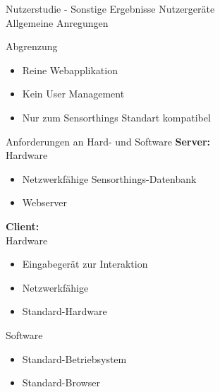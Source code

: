 \begin{frame}{Nutzerstudie - Sonstige Ergebnisse}
    \centering
    Nutzergeräte
    \\
    \vspace{1cm}
    Allgemeine Anregungen
\end{frame}
\begin{frame}{Abgrenzung}
    \begin{itemize}
        \item Reine Webapplikation
        \item Kein User Management
        \item Nur zum Sensorthings Standart kompatibel
    \end{itemize}
\end{frame}
\begin{frame}{Anforderungen an Hard- und Software}
    \textbf{Server:}\\
    Hardware
    \begin{itemize}
        \item Netzwerkfähige Sensorthings-Datenbank
        \item Webserver
    \end{itemize}
    \pause
    \textbf{Client:}\\
    Hardware
    \begin{itemize}
        \item Eingabegerät zur Interaktion
        \item Netzwerkfähige
        \item Standard-Hardware
    \end{itemize}
    \pause
    Software
    \begin{itemize}
        \item Standard-Betriebsystem
        \item Standard-Browser
    \end{itemize}
\end{frame}